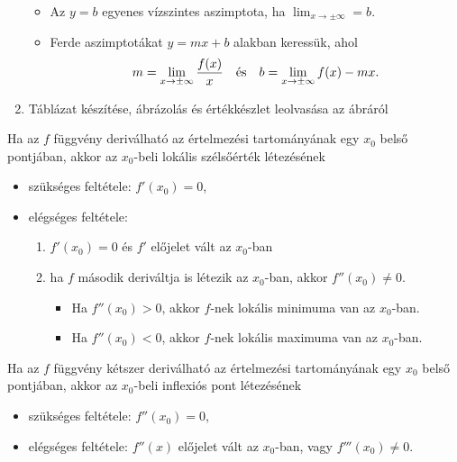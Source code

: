 \documentclass[a4paper, 12pt]{scrartcl}
\begin{document}
\begin{blueBox}
\begin{enumerate}
\begin{itemize}
            \item Az $y = b$ egyenes vízszintes aszimptota, ha
                  $\displaystyle\lim_{x \rightarrow \pm \infty} = b$.

            \item Ferde aszimptotákat $y = mx + b$ alakban keressük, ahol
                  \[
                    m = \lim_{x \rightarrow \pm \infty} \frac{f(x)}{x}
                    \quad \text{és} \quad
                    b = \lim_{x \rightarrow \pm \infty} f(x) - mx
                    \text.
                  \]
          \end{itemize}

    \item Táblázat készítése, ábrázolás és értékkészlet leolvasása az ábráról
  \end{enumerate}
\end{blueBox}

\begin{theorem}
  Ha az $f$ függvény deriválható az értelmezési tartományának egy
  $x_0$ belső pontjában, akkor az $x_0$-beli lokális szélsőérték
  létezésének
  \begin{itemize}
    \item szükséges feltétele:
          $f'(x_0) = 0$,

    \item elégséges feltétele:
          \begin{enumerate}
            \item $f'(x_0) = 0$ és $f'$ előjelet vált az $x_0$-ban
            \item ha $f$ második deriváltja is létezik az $x_0$-ban, akkor
                  $f''(x_0) \neq 0$.
                  \begin{itemize}
                    \item Ha $f''(x_0) > 0$, akkor $f$-nek lokális minimuma van
                          az $x_0$-ban.
                    \item Ha $f''(x_0) < 0$, akkor $f$-nek lokális maximuma van
                          az $x_0$-ban.
                  \end{itemize}
          \end{enumerate}
  \end{itemize}
\end{theorem}

\begin{theorem}
  Ha az $f$ függvény kétszer deriválható az értelmezési tartományának egy
  $x_0$ belső pontjában, akkor az $x_0$-beli inflexiós pont létezésének
  \begin{itemize}
    \item szükséges feltétele:
          $f''(x_0) = 0$,

    \item elégséges feltétele:
          $f''(x)$ előjelet vált az $x_0$-ban, vagy $f'''(x_0) \neq 0$.
  \end{itemize}
\end{theorem}
\end{document}
